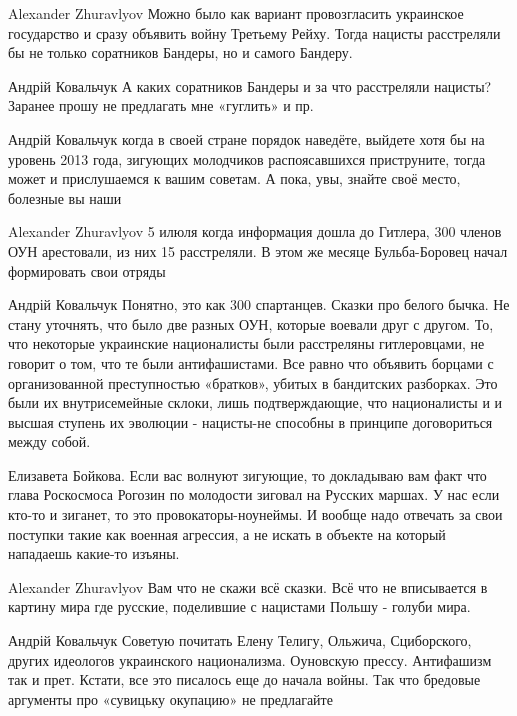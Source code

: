 \begin{itemize}

Alexander Zhuravlyov Можно было как вариант провозгласить украинское
государство и сразу объявить войну Третьему Рейху. Тогда нацисты расстреляли бы
не только соратников Бандеры, но и самого Бандеру.


Андрій Ковальчук А каких соратников Бандеры и за что расстреляли нацисты?
Заранее прошу не предлагать мне «гуглить» и пр.


Андрій Ковальчук когда в своей стране порядок наведёте, выйдете хотя бы на
уровень 2013 года, зигующих молодчиков распоясавшихся приструните, тогда может
и прислушаемся к вашим советам. А пока, увы, знайте своё место, болезные вы
наши


Alexander Zhuravlyov 5 илюля когда информация дошла до Гитлера, 300 членов ОУН
арестовали, из них 15 расстреляли. В этом же месяце Бульба-Боровец начал
формировать свои отряды


Андрій Ковальчук Понятно, это как 300 спартанцев. Сказки про белого бычка. Не
стану уточнять, что было две разных ОУН, которые воевали друг с другом. То, что
некоторые украинские националисты были расстреляны гитлеровцами, не говорит о
том, что те были антифашистами. Все равно что объявить борцами с организованной
преступностью «братков», убитых в бандитских разборках. Это были их
внутрисемейные склоки, лишь подтверждающие, что националисты и и высшая ступень
их эволюции - нацисты-не способны в принципе договориться между собой.


Елизавета Бойкова. Если вас волнуют зигующие, то докладываю вам факт что глава
Роскосмоса Рогозин по молодости зиговал на Русских маршах. У нас если кто-то и
зиганет, то это провокаторы-ноунеймы. И вообще надо отвечать за свои поступки
такие как военная агрессия, а не искать в объекте на который нападаешь какие-то
изъяны.


Alexander Zhuravlyov Вам что не скажи всё сказки. Всё что не вписывается в
картину мира где русские, поделившие с нацистами Польшу - голуби мира.


Андрій Ковальчук Советую почитать Елену Телигу, Ольжича, Сциборского, других
идеологов украинского национализма. Оуновскую прессу. Антифашизм так и прет.
Кстати, все это писалось еще до начала войны. Так что бредовые аргументы про
«сувицьку окупацию» не предлагайте


\end{itemize}
